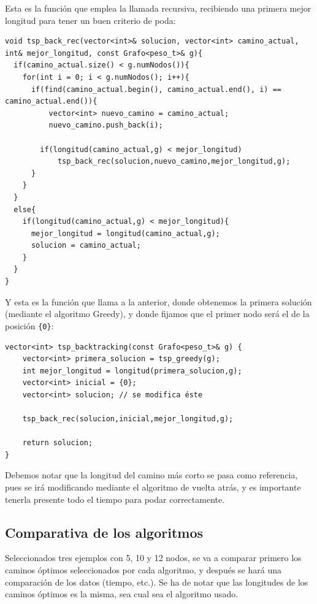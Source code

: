 Esta es la función que emplea la llamada recursiva, recibiendo una primera mejor longitud para tener un buen criterio de poda:

\begin{lstlisting}
void tsp_back_rec(vector<int>& solucion, vector<int> camino_actual, int& mejor_longitud, const Grafo<peso_t>& g){
  if(camino_actual.size() < g.numNodos()){
    for(int i = 0; i < g.numNodos(); i++){
      if(find(camino_actual.begin(), camino_actual.end(), i) == camino_actual.end()){
	      vector<int> nuevo_camino = camino_actual;
	      nuevo_camino.push_back(i);

        if(longitud(camino_actual,g) < mejor_longitud)
	        tsp_back_rec(solucion,nuevo_camino,mejor_longitud,g);
      }
    }
  }
  else{
    if(longitud(camino_actual,g) < mejor_longitud){
      mejor_longitud = longitud(camino_actual,g);
      solucion = camino_actual;
    }
  }
}
\end{lstlisting}

Y esta es la función que llama a la anterior, donde obtenemos la primera solución (mediante el algoritmo Greedy), y donde fijamos que el primer nodo será el de la posición \texttt{\{0\}}:

\begin{lstlisting}
vector<int> tsp_backtracking(const Grafo<peso_t>& g) {
	vector<int> primera_solucion = tsp_greedy(g);
	int mejor_longitud = longitud(primera_solucion,g);
	vector<int> inicial = {0};
	vector<int> solucion; // se modifica éste

	tsp_back_rec(solucion,inicial,mejor_longitud,g);

	return solucion;
}
\end{lstlisting}

Debemos notar que la longitud del camino más corto se pasa como referencia, pues se irá modificando mediante el algoritmo de vuelta atrás, y es importante tenerla presente todo el tiempo para podar correctamente.

\subsection{Comparativa de los algoritmos}

Seleccionados tres ejemplos con 5, 10 y 12 nodos, se va a comparar primero los caminos óptimos seleccionados por cada algoritmo, y después se hará una comparación de los datos (tiempo, etc.). Se ha de notar que las longitudes de los caminos óptimos es la misma, sea cual sea el algoritmo usado.


